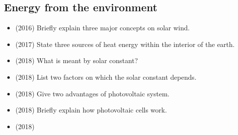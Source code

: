 \documentclass{article}
\begin{document}
\subsection{Energy from the environment}
\begin{itemize}
\item (2016)  Briefly explain three major concepts on solar wind.
\item (2017)  State three sources of heat energy within the interior of the earth. 
\item (2018)  What is meant by solar constant? 
\item (2018)  List two factors on which the solar constant depends. 
\item (2018)  Give two advantages of photovoltaic system. 
\item (2018)  Briefly explain how photovoltaic cells work. 
\item (2018)  \end{itemize}
\end{document}
